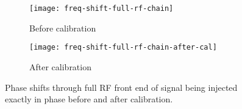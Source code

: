 \begin{figure}
  \begin{subfigure}[b]{0.49\textwidth}
    \centering
    \texttt{[image: freq-shift-full-rf-chain]}
    \caption{Before calibration}
  \end{subfigure}
  \begin{subfigure}[b]{0.49\textwidth}
    \centering
    \texttt{[image: freq-shift-full-rf-chain-after-cal]}
    \caption{After calibration}
  \end{subfigure}
  \caption{Phase shifts through full RF front end of signal being injected exactly in phase before and after calibration.}
  \label{fig:software:time-domain-cal-graphs}
\end{figure}


